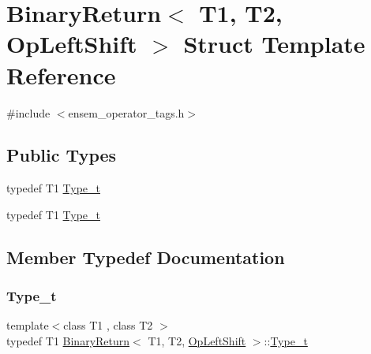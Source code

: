 \hypertarget{structBinaryReturn_3_01T1_00_01T2_00_01OpLeftShift_01_4}{}\section{Binary\+Return$<$ T1, T2, Op\+Left\+Shift $>$ Struct Template Reference}
\label{structBinaryReturn_3_01T1_00_01T2_00_01OpLeftShift_01_4}


{\ttfamily \#include $<$ensem\+\_\+operator\+\_\+tags.\+h$>$}

\subsection*{Public Types}
\begin{DoxyCompactItemize}
\item 
typedef T1 \mbox{\hyperlink{structBinaryReturn_3_01T1_00_01T2_00_01OpLeftShift_01_4_a49e088c9b6e38646dc1ee380d7c79c39}{Type\+\_\+t}}
\item 
typedef T1 \mbox{\hyperlink{structBinaryReturn_3_01T1_00_01T2_00_01OpLeftShift_01_4_a49e088c9b6e38646dc1ee380d7c79c39}{Type\+\_\+t}}
\end{DoxyCompactItemize}


\subsection{Member Typedef Documentation}
\mbox{\label{structBinaryReturn_3_01T1_00_01T2_00_01OpLeftShift_01_4_a49e088c9b6e38646dc1ee380d7c79c39}} 
\subsubsection{\texorpdfstring{Type\_t}{Type\_t}\hspace{0.1cm}{\footnotesize\ttfamily [1/2]}}
{\footnotesize\ttfamily template$<$class T1 , class T2 $>$ \\
typedef T1 \mbox{\hyperlink{structBinaryReturn}{Binary\+Return}}$<$ T1, T2, \mbox{\hyperlink{structOpLeftShift}{Op\+Left\+Shift}} $>$\+::\mbox{\hyperlink{structBinaryReturn_3_01T1_00_01T2_00_01OpLeftShift_01_4_a49e088c9b6e38646dc1ee380d7c79c39}{Type\+\_\+t}}}

